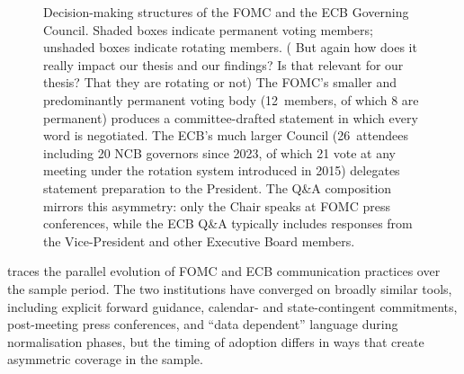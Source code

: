 \begin{figure}[htbp]
\begin{tikzpicture}
\end{tikzpicture}
\caption[Decision-making structures]{Decision-making structures of
the FOMC and the ECB Governing Council. Shaded boxes indicate
permanent voting members; unshaded boxes indicate rotating members. ( But again how does it really impact our thesis and our findings? Is that relevant for our thesis? That they are rotating or not)
The FOMC's smaller and predominantly permanent voting body
(12~members, of which 8 are permanent) produces a committee-drafted
statement in which every word is negotiated. The ECB's much larger
Council (26~attendees including 20 NCB governors since 2023, of
which 21 vote at any meeting under the rotation system introduced
in 2015) delegates statement preparation to the President. The Q\&A
composition mirrors this asymmetry: only the Chair speaks at FOMC
press conferences, while the ECB Q\&A typically includes responses
from the Vice-President and other Executive Board members.}
\label{fig:decision_making}
\end{figure}


 traces the parallel evolution of
FOMC and ECB communication practices over the sample period.
The two institutions have converged on broadly similar tools,
including explicit forward guidance, calendar- and state-contingent
commitments, post-meeting press conferences, and ``data dependent''
language during normalisation phases, but the timing of adoption
differs in ways that create asymmetric coverage in the sample.

